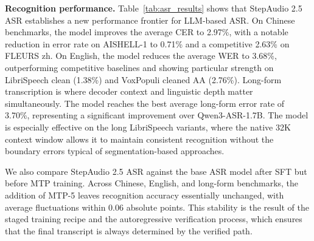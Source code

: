 \textbf{Recognition performance.} Table~\ref{tab:asr_results} shows that StepAudio 2.5 ASR establishes a new performance frontier for LLM-based ASR. On Chinese benchmarks, the model improves the average CER to 2.97\%, with a notable reduction in error rate on AISHELL-1 to 0.71\% and a competitive 2.63\% on FLEURS zh. On English, the model reduces the average WER to 3.68\%, outperforming competitive baselines and showing particular strength on LibriSpeech clean (1.38\%) and VoxPopuli cleaned AA (2.76\%). Long-form transcription is where decoder context and linguistic depth matter simultaneously. The model reaches the best average long-form error rate of 3.70\%, representing a significant improvement over Qwen3-ASR-1.7B. The model is especially effective on the long LibriSpeech variants, where the native 32K context window allows it to maintain consistent recognition without the boundary errors typical of segmentation-based approaches.

We also compare StepAudio 2.5 ASR against the base ASR model after SFT but before MTP training. Across Chinese, English, and long-form benchmarks, the addition of MTP-5 leaves recognition accuracy essentially unchanged, with average fluctuations within 0.06 absolute points. This stability is the result of the staged training recipe and the autoregressive verification process, which ensures that the final transcript is always determined by the verified path.



